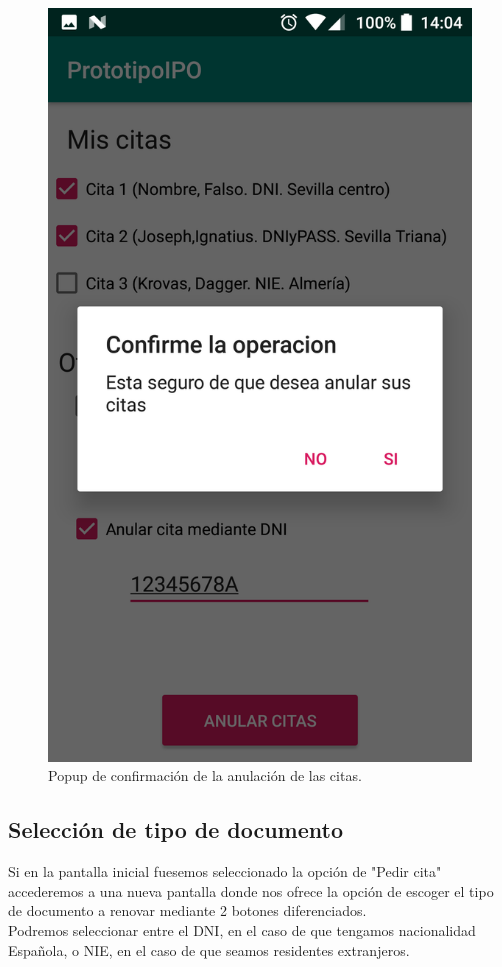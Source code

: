 \documentclass[a4paper,11pt]{article}
\begin{document}
\begin{figure}[H]
\begin{minipage}{0.45\linewidth}
\includegraphics[width=\textwidth]{3.png}
\caption{Popup de confirmación de la anulación de las citas.}
\label{fig:anula2}
\end{minipage}
\end{figure}


\subsection{Selección de tipo de documento}
Si en la pantalla inicial fuesemos seleccionado la opción de "Pedir cita" accederemos a una nueva pantalla donde nos ofrece la opción de escoger el tipo de documento a renovar mediante 2 botones diferenciados.\\
Podremos seleccionar entre el DNI, en el caso de que tengamos nacionalidad Española, o NIE, en el caso de que seamos residentes extranjeros.\\
\end{document}
